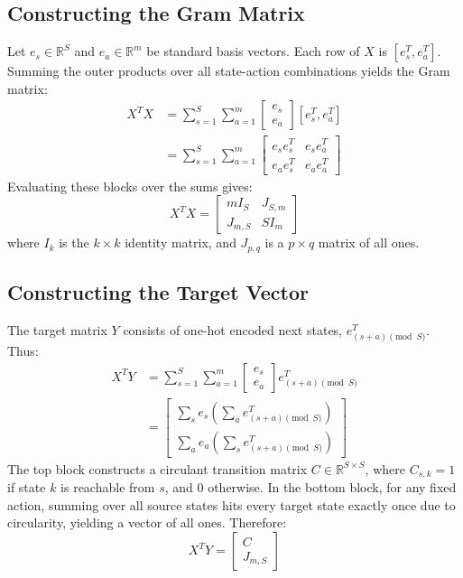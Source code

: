 \documentclass{article}
\begin{document}
\subsection{Constructing the Gram Matrix}
Let $e_s \in \mathbb{R}^S$ and $e_a \in \mathbb{R}^m$ be standard basis vectors. Each row of $X$ is $[e_s^T, e_a^T]$. Summing the outer products over all state-action combinations yields the Gram matrix:
\begin{align}
    X^T X &= \sum_{s=1}^S \sum_{a=1}^m \begin{bmatrix} e_s \\ e_a \end{bmatrix} [e_s^T, e_a^T] \nonumber \\
    &= \sum_{s=1}^S \sum_{a=1}^m \begin{bmatrix} e_s e_s^T & e_s e_a^T \\ e_a e_s^T & e_a e_a^T \end{bmatrix}
\end{align}
Evaluating these blocks over the sums gives:
\begin{equation}
    X^T X = \begin{bmatrix} m I_S & J_{S, m} \\ J_{m, S} & S I_m \end{bmatrix}
\end{equation}
where $I_k$ is the $k \times k$ identity matrix, and $J_{p,q}$ is a $p \times q$ matrix of all ones.

\subsection{Constructing the Target Vector}
The target matrix $Y$ consists of one-hot encoded next states, $e_{(s+a) \pmod S}^T$. Thus:
\begin{align}
    X^T Y &= \sum_{s=1}^S \sum_{a=1}^m \begin{bmatrix} e_s \\ e_a \end{bmatrix} e_{(s+a) \pmod S}^T \nonumber \\
    &= \begin{bmatrix} \sum_s e_s \left(\sum_a e_{(s+a) \pmod S}^T\right) \\ \sum_a e_a \left(\sum_s e_{(s+a) \pmod S}^T\right) \end{bmatrix}
\end{align}
The top block constructs a circulant transition matrix $C \in \mathbb{R}^{S \times S}$, where $C_{s,k} = 1$ if state $k$ is reachable from $s$, and $0$ otherwise. In the bottom block, for any fixed action, summing over all source states hits every target state exactly once due to circularity, yielding a vector of all ones. Therefore:
\begin{equation}
    X^T Y = \begin{bmatrix} C \\ J_{m, S} \end{bmatrix}
\end{equation}
\end{document}
